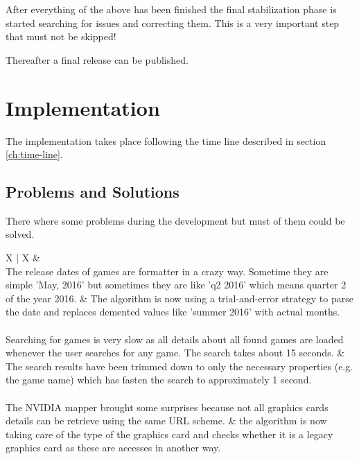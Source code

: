 \documentclass[12pt]{scrreprt}
\begin{document}
		After everything of the above has been finished the final stabilization phase is started searching for issues and correcting them. This is a very important step that must not be skipped!

		Thereafter a final release can be published.



	\chapter{Implementation}
		\label{ch:implementation}

		The implementation takes place following the time line described in section \ref{ch:time-line}.

		\section{Problems and Solutions}
			\label{sec:implementation_problems}

			There where some problems during the development but must of them could be solved.
			\begin{table}[H]
				\label{tab:problems_solutions}
				\centering
				\begin{tabularx}{\textwidth}{ X | X }
					 & 
					\\ \hline
					The release dates of games are formatter in a crazy way. Sometime they are simple 'May, 2016' but sometimes they are like 'q2 2016' which means quarter 2 of the year 2016. & The algorithm is now using a trial-and-error strategy to parse the date and replaces demented values like 'summer 2016' with actual months.
					\\ \\
					Searching for games is very slow as all details about all found games are loaded whenever the user searches for any game. The search takes about 15 seconds. & The search results have been trimmed down to only the necessary properties (e.g. the game name) which has fasten the search to approximately 1 second.
					\\ \\
					The NVIDIA mapper brought some surprises because not all graphics cards details can be retrieve using the same URL scheme. & the algorithm is now taking care of the type of the graphics card and checks whether it is a legacy graphics card as these are accesses in another way.
				\end{tabularx}
				\caption{Known Issues}
			\end{table}
\end{document}
